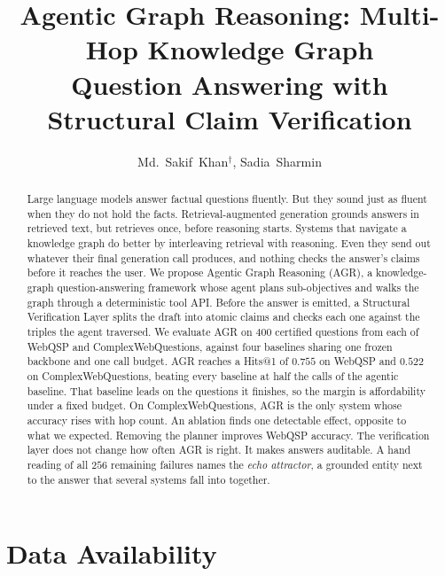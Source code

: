\documentclass[10pt,twocolumn,a4paper]{article}
\title{Agentic Graph Reasoning: Multi-Hop Knowledge Graph\\
Question Answering with Structural Claim Verification}
\author{Md.~Sakif~Khan$^{\dagger}$, Sadia~Sharmin}
\affiliation{Department of Computer Science and Engineering\\
Bangladesh University of Engineering and Technology, Dhaka, Bangladesh}
\begin{document}

\maketitle

\begin{abstract}
Large language models answer factual questions fluently. But they sound just
as fluent when they do not hold the facts. Retrieval-augmented generation
grounds answers in retrieved text, but retrieves once, before reasoning starts.
Systems that navigate a knowledge graph do better by interleaving retrieval
with reasoning. Even they send out whatever their final generation call
produces, and nothing checks the answer's claims before it reaches the user.
We propose Agentic Graph Reasoning (AGR), a knowledge-graph question-answering
framework whose agent plans sub-objectives and walks the graph through a
deterministic tool API. Before the answer is emitted, a Structural Verification
Layer splits the draft into atomic claims and checks each one against the
triples the agent traversed. We evaluate AGR on $400$ certified questions from
each of WebQSP and ComplexWebQuestions, against four baselines sharing one
frozen backbone and one call budget. AGR reaches a Hits@1 of $0.755$ on WebQSP
and $0.522$ on ComplexWebQuestions, beating every baseline at half the calls of
the agentic baseline. That baseline leads on the questions it finishes, so the
margin is affordability under a fixed budget. On ComplexWebQuestions, AGR is
the only system whose accuracy rises with hop count. An ablation finds one
detectable effect, opposite to what we expected. Removing the planner improves
WebQSP accuracy. The verification layer does not change how often AGR is right.
It makes answers auditable. A hand reading of all $256$ remaining failures
names the \emph{echo attractor}, a grounded entity next to the answer that
several systems fall into together.
\end{abstract}












\section*{Data Availability}
\end{document}
